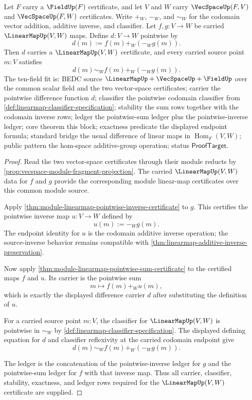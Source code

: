 \begin{theorem}
\label{thm:linearmap-difference-preservation}
Let $F$ carry a $\FieldUp(F)$ certificate, and let $V$ and $W$ carry $\VecSpaceUp(F,V)$ and $\VecSpaceUp(F,W)$ certificates. Write $+_W$, $-_W$, and $\sim_W$ for the codomain vector addition, additive inverse, and classifier. Let $f,g:V\to W$ be carried $\LinearMapUp(V,W)$ maps. Define $d:V\to W$ pointwise by
$$
d(m):=f(m)+_W(-_W g(m)).
$$
Then $d$ carries a $\LinearMapUp(V,W)$ certificate, and every carried source point $m:V$ satisfies
$$
d(m)\sim_W f(m)+_W(-_W g(m)).
$$
The ten-field fit is: BEDC source $\LinearMapUp+\VecSpaceUp+\FieldUp$ over the common scalar field and the two vector-space certificates; carrier the pointwise difference function $d$; classifier the pointwise codomain classifier from \autoref{def:linearmap-classifier-specification}; stability the sum rows together with the codomain inverse rows; ledger the pointwise-sum ledger plus the pointwise-inverse ledger; core theorem this block; exactness predicate the displayed endpoint formula; standard bridge the usual difference of linear maps in $\operatorname{Hom}_F(V,W)$; public pattern the hom-space additive-group operation; status $\mathsf{ProofTarget}$.
\end{theorem}
\begin{proof}
Read the two vector-space certificates through their module reducts by \autoref{prop:vecspace-module-fragment-projection}. The carried $\LinearMapUp(V,W)$ data for $f$ and $g$ provide the corresponding module linear-map certificates over this common module source.

Apply \autoref{thm:module-linearmap-pointwise-inverse-certificate} to $g$. This certifies the pointwise inverse map $u:V\to W$ defined by
$$
u(m):=-_W g(m).
$$
The endpoint identity for $u$ is the codomain additive inverse operation; the source-inverse behavior remains compatible with \autoref{thm:linearmap-additive-inverse-preservation}.

Now apply \autoref{thm:module-linearmap-pointwise-sum-certificate} to the certified maps $f$ and $u$. Its carrier is the pointwise sum
$$
m\longmapsto f(m)+_W u(m),
$$
which is exactly the displayed difference carrier $d$ after substituting the definition of $u$.

For a carried source point $m:V$, the classifier for $\LinearMapUp(V,W)$ is pointwise in $\sim_W$ by \autoref{def:linearmap-classifier-specification}. The displayed defining equation for $d$ and classifier reflexivity at the carried codomain endpoint give
$$
d(m)\sim_W f(m)+_W(-_W g(m)).
$$

The ledger is the concatenation of the pointwise-inverse ledger for $g$ and the pointwise-sum ledger for $f$ with that inverse map. Thus all carrier, classifier, stability, exactness, and ledger rows required for the $\LinearMapUp(V,W)$ certificate are supplied.
\end{proof}



